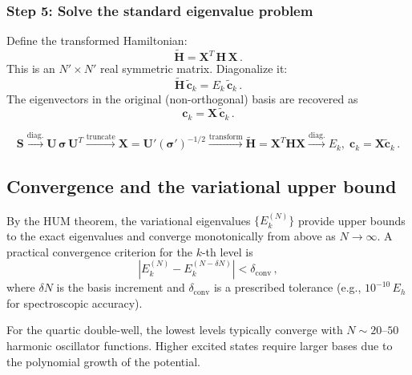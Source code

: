 \subsubsection{Step 5: Solve the standard eigenvalue problem}

Define the transformed Hamiltonian:
\begin{equation}
  \tilde{\mathbf{H}} = \mathbf{X}^T\,\mathbf{H}\,\mathbf{X}\,.
\end{equation}
This is an $N' \times N'$ real symmetric matrix. Diagonalize it:
\begin{equation}
  \tilde{\mathbf{H}}\,\tilde{\mathbf{c}}_k = E_k\,\tilde{\mathbf{c}}_k\,.
\end{equation}
The eigenvectors in the original (non-orthogonal) basis are recovered as
\begin{equation}\label{eq:Lowdin_backtransform}
  \mathbf{c}_k = \mathbf{X}\,\tilde{\mathbf{c}}_k\,.
\end{equation}

\begin{result}
\begin{equation}
  \mathbf{S} \xrightarrow{\text{diag.}} \mathbf{U}\,\bm{\sigma}\,\mathbf{U}^T
  \xrightarrow{\text{truncate}} \mathbf{X} = \mathbf{U}'(\bm{\sigma}')^{-1/2}
  \xrightarrow{\text{transform}} \tilde{\mathbf{H}} = \mathbf{X}^T\mathbf{H}\mathbf{X}
  \xrightarrow{\text{diag.}} E_k,\;\mathbf{c}_k = \mathbf{X}\tilde{\mathbf{c}}_k\,.
\end{equation}
\end{result}

\subsection{Convergence and the variational upper bound}

By the HUM theorem, the variational eigenvalues $\{E_k^{(N)}\}$ provide upper bounds to
the exact eigenvalues and converge monotonically from above as $N \to \infty$.
A practical convergence criterion for the $k$-th level is
\begin{equation}
  |E_k^{(N)} - E_k^{(N-\delta N)}| < \delta_{\text{conv}}\,,
\end{equation}
where $\delta N$ is the basis increment and $\delta_{\text{conv}}$ is a prescribed tolerance
(e.g., $10^{-10}\,E_h$ for spectroscopic accuracy).

For the quartic double-well, the lowest levels typically converge with $N \sim 20$--$50$
harmonic oscillator functions. Higher excited states require larger bases due to the
polynomial growth of the potential.

